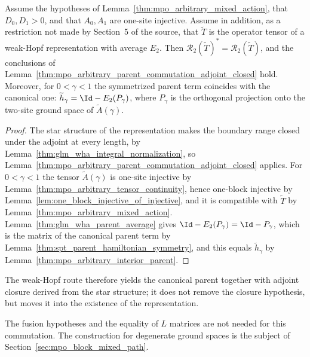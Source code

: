 \begin{lemma}
    \label{thm:mpo_arbitrary_parent_commutation_weak_hopf}
    \leanok
    Assume the hypotheses of Lemma~\ref{thm:mpo_arbitrary_mixed_action},
    that $D_0,D_1>0$, and that $A_0,A_1$ are one-site injective. Assume in
    addition, as a restriction not made by Section~5 of the source, that
    $\widetilde T$ is the operator tensor of a weak-Hopf representation with
    average $E_2$. Then
    $\mathcal R_2(\widetilde T)^*=\mathcal R_2(\widetilde T)$, and the
    conclusions of
    Lemma~\ref{thm:mpo_arbitrary_parent_commutation_adjoint_closed} hold.
    Moreover, for $0<\gamma<1$ the symmetrized parent term coincides with the
    canonical one: $\widetilde h_\gamma=\Id-E_2(P_\gamma)$, where $P_\gamma$
    is the orthogonal projection onto the two-site ground space of
    $\widetilde A(\gamma)$.
\end{lemma}
\begin{proof}
    \leanok
    The star structure of the representation makes the boundary range
    closed under the adjoint at every length, by
    Lemma~\ref{thm:glm_wha_integral_normalization}, so
    Lemma~\ref{thm:mpo_arbitrary_parent_commutation_adjoint_closed}
    applies. For $0<\gamma<1$ the tensor $\widetilde A(\gamma)$ is
    one-site injective by Lemma~\ref{thm:mpo_arbitrary_tensor_continuity},
    hence one-block injective by
    Lemma~\ref{lem:one_block_injective_of_injective}, and it is compatible
    with $\widetilde T$ by Lemma~\ref{thm:mpo_arbitrary_mixed_action}.
    Lemma~\ref{thm:glm_wha_parent_average} gives $\Id-E_2(P_\gamma)=\Id-P_\gamma$,
    which is the matrix of the canonical parent term by
    Lemma~\ref{thm:spt_parent_hamiltonian_symmetry}, and this equals
    $\widetilde h_\gamma$ by Lemma~\ref{thm:mpo_arbitrary_interior_parent}.
\end{proof}

The weak-Hopf route therefore yields the canonical parent together with
adjoint closure derived from the star structure; it does not remove the
closure hypothesis, but moves it into the existence of the representation.

The fusion hypotheses and the equality of $L$ matrices are not needed for
this commutation. The construction for degenerate ground spaces is the
subject of Section~\ref{sec:mpo_block_mixed_path}.
